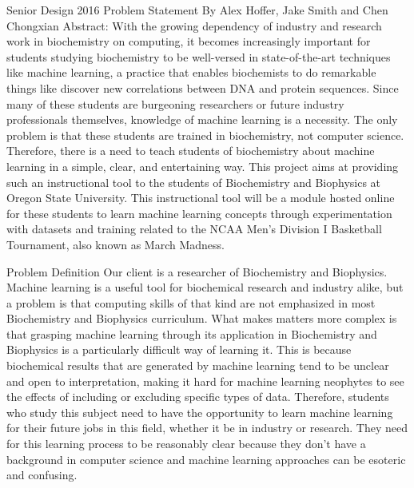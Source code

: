 \documentclass[letterpaper,20pt,titlepage]{article}
\begin{document}
\begin{center}

Senior Design 2016
\bigbreak
Problem Statement
\bigbreak
By Alex Hoffer, Jake Smith and Chen Chongxian
\bigbreak
Abstract:
\newline
With the growing dependency of industry and research work in biochemistry on computing, it becomes increasingly important for students studying biochemistry to be well-versed in state-of-the-art techniques like machine learning, a practice that enables biochemists to do remarkable things like discover new correlations between DNA and protein sequences. Since many of these students are burgeoning researchers or future industry professionals themselves, knowledge of machine learning is a necessity. The only problem is that these students are trained in biochemistry, not computer science. Therefore, there is a need to teach students of biochemistry about machine learning in a simple, clear, and entertaining way. This project aims at providing such an instructional tool to the students of Biochemistry and Biophysics at Oregon State University. This instructional tool will be a module hosted online for these students to learn machine learning concepts through experimentation with datasets and training related to the NCAA Men’s Division I Basketball Tournament, also known as March Madness. 
\newpage
\end{center}





\begin{section}{Problem Definition}
Our client is a researcher of Biochemistry and Biophysics. Machine learning is a useful tool for biochemical research and industry alike, but a problem is that computing skills of that kind are not emphasized in most Biochemistry and Biophysics curriculum. What makes matters more complex is that grasping machine learning through its application in Biochemistry and Biophysics is a particularly difficult way of learning it. This is because biochemical results that are generated by machine learning tend to be unclear and open to interpretation, making it hard for machine learning neophytes to see the effects of including or excluding specific types of data. Therefore, students who study this subject need to have the opportunity to learn machine learning for their future jobs in this field, whether it be in industry or research. They need for this learning process to be reasonably clear because they don’t have a background in computer science and machine learning approaches can be esoteric and confusing. 
\end{section}
\end{document}
